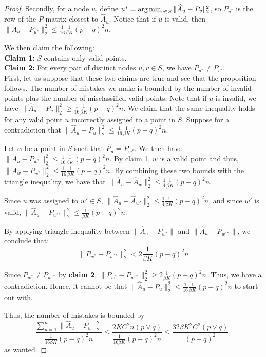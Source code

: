 \begin{proof}
Secondly, for a node $u$, define $u^* = \mathop{\text{\rm arg\,min}}_{v \in S} \| \widehat{A}_u - P_v \|_2^2$, so $P_{u^*}$ is the row of the $P$ matrix closest to $\hat{A}_u$. Notice that if $u$ is valid, then $\| \hat{A}_u - P_{u^*} \|_2^2 \leq \frac{1}{16} \frac{1}{\beta K} (p - q)^2 n$.

We then claim the following: \\

\noindent \textbf{Claim 1:} $S$ contains only valid points. \\
\textbf{Claim 2:} For every pair of distinct nodes $u,v \in S$, we have $P_{u^*} \neq P_{v^*}$. \\

First, let us suppose that these two claims are true and see that the proposition follows. The number of mistakes we make is bounded by the number of invalid points plus the number of misclassified valid points. Note that if $u$ is invalid, we have $\|\hat{A}_u - P_u\|_2^2 \ge \frac{1}{16} \frac{1}{\beta K} (p-q)^2n$. We claim that the same inequality holds for any valid point $u$ incorrectly assigned to a point in $S$. Suppose for a contradiction that 
$ \| \hat{A}_u - P_u \|_2^2 \leq \frac{1}{16} \frac{1}{\beta K} (p-q)^2 n$. 


Let $w$ be a point in $S$ such that $P_u = P_{w^*}$. We then have $ \| \hat{A}_u - P_{w^*} \|_2^2 \leq \frac{1}{16} \frac{1}{\beta K} (p-q)^2 n$. By claim 1, $w$ is a valid point and thus, $\| \hat{A}_w - P_{w^*} \|_2^2 \leq  \frac{1}{16} \frac{1}{\beta K} (p-q)^2 n$. By combining these two bounds with the triangle inequality, we have that $\| \hat{A}_u - \hat{A}_w \|_2^2 \leq \frac{1}{4} \frac{1}{\beta K} (p-q)^2 n$.

Since $u$ was assigned to $w' \in S$,  $\| \hat{A}_u - \hat{A}_{w'} \|_2^2 \leq \frac{1}{4} \frac{1}{\beta K} (p-q)^2 n$, and since $w'$ is valid, 
$\|  \hat{A}_u - P_{w^{\prime *}} \|_2^2 \leq \frac{1}{\beta K} (p-q)^2 n$. 


By applying triangle inequality between $\| \hat{A}_u - P_{w^*} \|$ and $\| \hat{A}_u - P_{w^{\prime *}} \|$, we conclude that:
\[
\| P_{w^*} - P_{w^{\prime *}} \|_2^2 < 2 \frac{1}{\beta K} (p-q)^2 n
\]

Since $P_{w^*} \neq P_{w^{\prime *}}$ by \textbf{claim 2}, $\| P_{w^*} - P_{w^{\prime *}} \|_2^2 \geq 2 \frac{1}{\beta K} (p-q)^2 n$. Thus, we have a contradiction. Hence, it cannot be that $ \| \hat{A}_u - P_u \|_2^2 \leq \frac{1}{16} \frac{1}{\beta K} (p-q)^2 n$ to start out with. 

Thus, the number of mistakes is bounded by
\[
\frac{\sum_{u=1}^n \| \hat{A}_u - P_u \|_2^2}{ \frac{1}{16 \beta K} (p-q)^2 n } \leq 
        \frac{ 2 K C^2 n (p \vee q)}{ \frac{1}{16 \beta K} (p-q)^2 n} \leq \frac{32 \beta K^2 C^2 (p \vee q)}{(p-q)^2},
\]
as wanted.


\end{proof}
